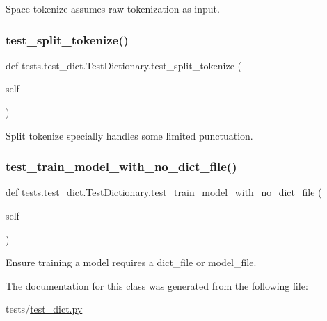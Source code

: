 \begin{DoxyVerb}Space tokenize assumes raw tokenization as input.
\end{DoxyVerb}
 \mbox{\label{classtests_1_1test__dict_1_1TestDictionary_aa10a7901ffa04a2d0ba43b43b0a18f26}} 
\subsubsection{\texorpdfstring{test\+\_\+split\+\_\+tokenize()}{test\_split\_tokenize()}}
{\footnotesize\ttfamily def tests.\+test\+\_\+dict.\+Test\+Dictionary.\+test\+\_\+split\+\_\+tokenize (\begin{DoxyParamCaption}\item[{}]{self }\end{DoxyParamCaption})}

\begin{DoxyVerb}Split tokenize specially handles some limited punctuation.
\end{DoxyVerb}
 \mbox{\label{classtests_1_1test__dict_1_1TestDictionary_a33993874a2fa2dc57b3936479b17aae1}} 
\subsubsection{\texorpdfstring{test\+\_\+train\+\_\+model\+\_\+with\+\_\+no\+\_\+dict\+\_\+file()}{test\_train\_model\_with\_no\_dict\_file()}}
{\footnotesize\ttfamily def tests.\+test\+\_\+dict.\+Test\+Dictionary.\+test\+\_\+train\+\_\+model\+\_\+with\+\_\+no\+\_\+dict\+\_\+file (\begin{DoxyParamCaption}\item[{}]{self }\end{DoxyParamCaption})}

\begin{DoxyVerb}Ensure training a model requires a dict_file or model_file.
\end{DoxyVerb}
 

The documentation for this class was generated from the following file\+:\begin{DoxyCompactItemize}
\item 
tests/\hyperlink{test__dict_8py}{test\+\_\+dict.\+py}\end{DoxyCompactItemize}
